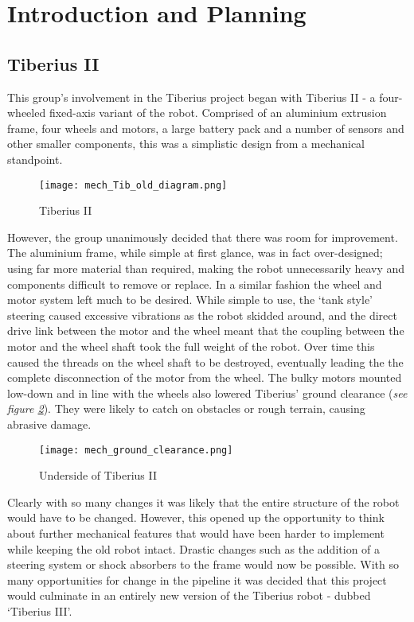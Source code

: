 \section{Introduction and Planning}
\subsection{Tiberius II}
\label{sec:Mech_IP_Tib2}

This group's involvement in the Tiberius project began with Tiberius II - a four-wheeled fixed-axis variant of the robot. Comprised of an aluminium extrusion frame, four wheels and motors, a large battery pack and a number of sensors and other smaller components, this was a simplistic design from a mechanical standpoint.
\begin{figure}[!htb]
\begin{center}
\texttt{[image: mech\_Tib\_old\_diagram.png]}
\end{center}
\caption{Tiberius II}
\label{fig:mech_old}
\end{figure}
\newline
However, the group unanimously decided that there was room for improvement. The aluminium frame, while simple at first glance, was in fact over-designed; using far more material than required, making the robot unnecessarily heavy and components difficult to remove or replace.
\newline
In a similar fashion the wheel and motor system left much to be desired. While simple to use, the `tank style' steering caused excessive vibrations as the robot skidded around, and the direct drive link between the motor and the wheel meant that the coupling between the motor and the wheel shaft took the full weight of the robot. Over time this caused the threads on the wheel shaft to be destroyed, eventually leading the the complete disconnection of the motor from the wheel. The bulky motors mounted low-down and in line with the wheels also lowered Tiberius' ground clearance (\textit{see figure \ref{fig:mech_gnd}}). They were likely to catch on obstacles or rough terrain, causing abrasive damage.
\begin{figure}[!htb]
\begin{center}
\texttt{[image: mech\_ground\_clearance.png]}
\end{center}
\caption{Underside of Tiberius II}
\label{fig:mech_gnd}
\end{figure}
\newline
Clearly with so many changes it was likely that the entire structure of the robot would have to be changed. However, this opened up the opportunity to think about further mechanical features that would have been harder to implement while keeping the old robot intact. Drastic changes such as the addition of a steering system or shock absorbers to the frame would now be possible.
\newline
With so many opportunities for change in the pipeline it was decided that this project would culminate in an entirely new version of the Tiberius robot - dubbed `Tiberius III'.
\newpage
